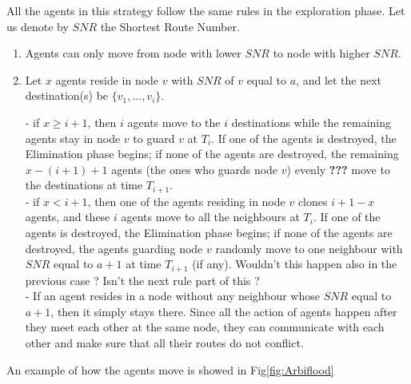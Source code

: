 All the agents in this strategy follow the same rules in the exploration phase.
Let us denote by $SNR$ the Shortest Route Number.
\begin{enumerate}
\item Agents can only move from node with lower $SNR$ to node with higher $SNR$.
\item Let  $x$ agents reside in node $v$ with   $SNR$ of $v$ equal to $a$, and let  the next destination(s) be $\{v_1,\ldots, v_i\}$. 

     -   if $x\geq i+1$, then $i$ agents move to the $i$ destinations  while the remaining agents stay in node $v$ to guard $v$ at $T_i$. If one of the agents is destroyed, the Elimination phase begins; if none of the agents are destroyed, the remaining $x-(i+1)+1$ agents (the ones who guards   node $v$)   evenly \color{blue} {\bf ???} \color{black} move to the destinations at  time $T_{i+1}$. \\
     -   if $x< i+1$, then one of the agents residing in node $v$ clones $i+1-x$ agents, and these $i$ agents move to all the neighbours at $T_i$. If one of the agents is destroyed, the Elimination phase begins; if none of the agents are destroyed, the agents guarding   node $v$ randomly move  to one neighbour with $SNR$ equal to $a+1$ at time $T_{i+1}$ (if any).
\color{blue}  Wouldn't this happen also in the previous case ?  Isn't the next rule part of this ?\\
- If an agent resides in a node without any neighbour whose $SNR$ equal to $a+1$, then it simply stays there.
 \color{black}
        Since all the action of agents happen after they meet each other at the same node, they can communicate with each other and make sure that all their routes do not conflict.
% 
\end{enumerate}
An example of how the agents move is showed in Fig\ref{fig:Arbiflood}
